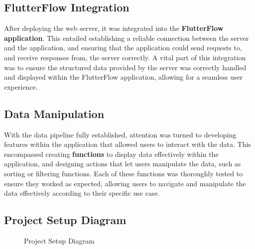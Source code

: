 \subsection{FlutterFlow Integration}
After deploying the web server, it was integrated into the {\color{limeGreen}\textbf{FlutterFlow application}}. 
This entailed establishing a reliable connection between the server and the application, and ensuring that the application could send requests to, and receive responses from, the server correctly. 
A vital part of this integration was to ensure the structured data provided by the server was correctly handled and displayed within the FlutterFlow application, allowing for a seamless user experience.

\subsection{Data Manipulation}

With the data pipeline fully established, attention was turned to developing features within the application that allowed users to interact with the  data. 
This encompassed creating {\color{limeGreen}\textbf{functions}} to display data effectively within the application, and designing actions that let users manipulate the data, such as sorting or filtering functions. 
Each of these functions was thoroughly tested to ensure they worked as expected, allowing users to navigate and manipulate the data effectively according to their specific use case.

\subsection{Project Setup Diagram}
\begin{figure}[H]
    \centering
    \caption{ Project Setup Diagram }
    \label{fig: Project_Setup_Diagram}
\end{figure}


